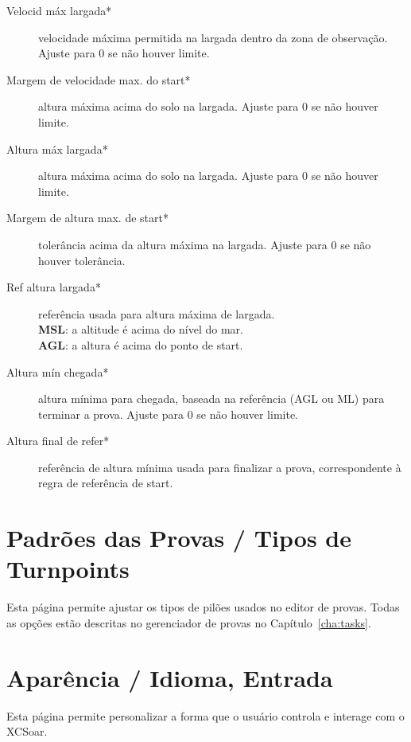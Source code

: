 \begin{description}
\item[Velocid máx largada*]  velocidade máxima permitida na largada dentro da zona de observação.  Ajuste para 0 se não houver limite.
\item[Margem de velocidade max. do start*] altura máxima acima do solo na largada.  Ajuste para 0 se não houver limite.
\item[Altura máx largada*]  altura máxima acima do solo na largada.  Ajuste para 0 se não houver limite.
\item[Margem de altura max. de start*]  tolerância acima da altura máxima na largada.  Ajuste para 0 se não houver tolerância.
\item[Ref altura largada*]  referência usada para altura máxima de largada. \\
  {\bf MSL}: a altitude é acima do nível do mar. \\
  {\bf AGL}: a altura é acima do ponto de start.
\item[Altura mín chegada*]  altura mínima para chegada, baseada na referência (AGL ou ML) para terminar a prova.  Ajuste para 0 se não houver limite.
\item[Altura final de refer*]  referência de altura mínima usada para finalizar a prova, correspondente à regra de referência de start.
\end{description}


\section{Padrões das Provas / Tipos de Turnpoints}

Esta página permite ajustar os tipos de pilões usados no editor de provas.  Todas as opções estão descritas no gerenciador de provas no Capítulo~\ref{cha:tasks}.


\section{Aparência / Idioma, Entrada}\label{sec:interface}

Esta página permite personalizar a forma que o usuário controla e interage com o XCSoar.

